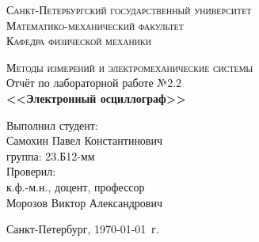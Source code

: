 \begin{titlepage}
\begin{center}
\textsc{Санкт-Петербургский государственный университет\\
Математико-механический факультет\\
Кафедра физической механики\\}

\vfill

\textsc{Методы измерений и электромеханические системы\\[3mm]}
Отчёт по лабораторной работе №2.2\\[6mm]


\textbf{\large<<Электронный осциллограф>>}

\vfill
\end{center}

\hfill
\begin{minipage}{.5\textwidth}
Выполнил студент:\\[2mm] 
Самохин Павел Константинович\\
группа: 23.Б12-мм\\[5mm]

Проверил:\\[2mm] 
к.ф.-м.н., доцент, профессор\\
Морозов Виктор Александрович
\end{minipage}%
\vfill
\begin{center}
 Санкт-Петербург, \yeardate\today\ г.
\end{center}
\end{titlepage}